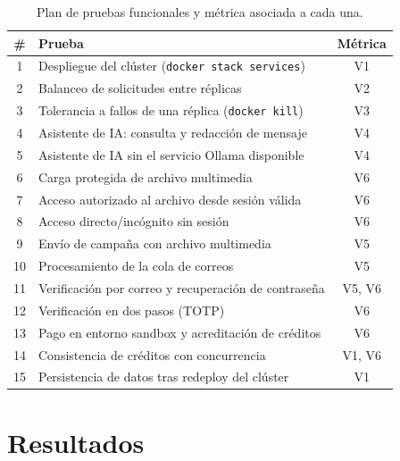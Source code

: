 \begin{table}[htbp]
  \centering
  \caption{Plan de pruebas funcionales y métrica asociada a cada una.}
  \label{tab:pruebas}
  \small
  \begin{tabular}{@{}c p{8.5cm} c@{}}
    \toprule
    \textbf{\#} & \textbf{Prueba} & \textbf{Métrica} \\
    \midrule
    1  & Despliegue del clúster (\texttt{docker stack services})        & V1 \\
    2  & Balanceo de solicitudes entre réplicas                          & V2 \\
    3  & Tolerancia a fallos de una réplica (\texttt{docker kill})       & V3 \\
    4  & Asistente de IA: consulta y redacción de mensaje                & V4 \\
    5  & Asistente de IA sin el servicio Ollama disponible                & V4 \\
    6  & Carga protegida de archivo multimedia                           & V6 \\
    7  & Acceso autorizado al archivo desde sesión válida                & V6 \\
    8  & Acceso directo/incógnito sin sesión                              & V6 \\
    9  & Envío de campaña con archivo multimedia                         & V5 \\
    10 & Procesamiento de la cola de correos                              & V5 \\
    11 & Verificación por correo y recuperación de contraseña            & V5, V6 \\
    12 & Verificación en dos pasos (TOTP)                                 & V6 \\
    13 & Pago en entorno sandbox y acreditación de créditos               & V6 \\
    14 & Consistencia de créditos con concurrencia                       & V1, V6 \\
    15 & Persistencia de datos tras redeploy del clúster                 & V1 \\
    \bottomrule
  \end{tabular}
\end{table}

\section{Resultados}

